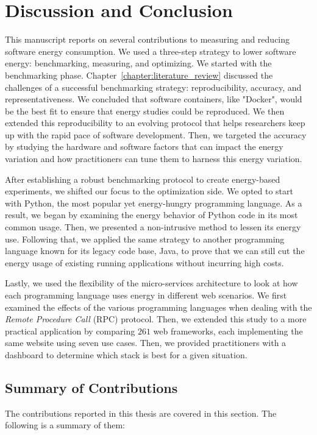 \clearpage
\chapter{Discussion and Conclusion}
\label{chapter:conclusion}

This manuscript reports on several contributions to measuring and reducing software energy consumption.
We used a three-step strategy to lower software energy: benchmarking, measuring, and optimizing.
We started with the benchmarking phase.
Chapter~\ref{chapter:literature_review} discussed the challenges of a successful benchmarking strategy: reproducibility, accuracy, and representativeness.
We concluded that software containers, like "Docker", would be the best fit to ensure that energy studies could be reproduced.
We then extended this reproducibility to an evolving protocol that helps researchers keep up with the rapid pace of software development.
Then, we targeted the accuracy by studying the hardware and software factors that can impact the energy variation and how practitioners can tune them to harness this energy variation.

After establishing a robust benchmarking protocol to create energy-based experiments, we shifted our focus to the optimization side.
We opted to start with Python, the most popular yet energy-hungry programming language.
As a result, we began by examining the energy behavior of Python code in its most common usage.
Then, we presented a non-intrusive method to lessen its energy use.
Following that, we applied the same strategy to another programming language known for its legacy code base, Java, to prove that we can still cut the energy usage of existing running applications without incurring high costs.

Lastly, we used the flexibility of the micro-services architecture to look at how each programming language uses energy in different web scenarios.
We first examined the effects of the various programming languages when dealing with the \emph{Remote Procedure Call} (RPC) protocol.
Then, we extended this study to a more practical application by comparing $261$ web frameworks, each implementing the same website using seven use cases.
Then, we provided practitioners with a dashboard to determine which stack is best for a given situation.


\section{Summary of Contributions}
\label{section:SummaryofContributions}
The contributions reported in this thesis are covered in this section.
The following is a summary of them:

